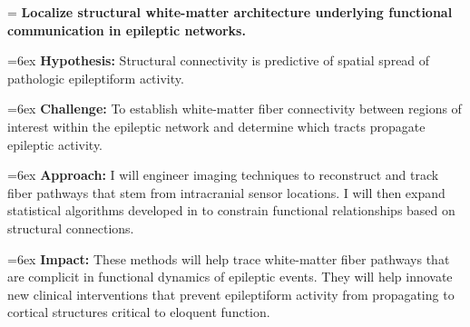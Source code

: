 \hangindent=\parindent
{}
\noindent
{} \textbf{Localize structural white-matter architecture underlying functional communication in epileptic networks.}

\hangindent=6ex
\textbf{Hypothesis:} Structural connectivity is predictive of spatial spread of pathologic epileptiform activity.

\hangindent=6ex
\textbf{Challenge:} To establish white-matter fiber connectivity between regions of interest within the epileptic network and determine which tracts propagate epileptic activity.

\hangindent=6ex
\textbf{Approach:} I will engineer imaging techniques to reconstruct and track fiber pathways that stem from intracranial sensor locations. I will then expand statistical algorithms developed in  to constrain functional relationships based on structural connections.

\hangindent=6ex
\textbf{Impact:} These methods will help trace white-matter fiber pathways that are complicit in functional dynamics of epileptic events. They will help innovate new clinical interventions that prevent epileptiform activity from propagating to cortical structures critical to eloquent function.
